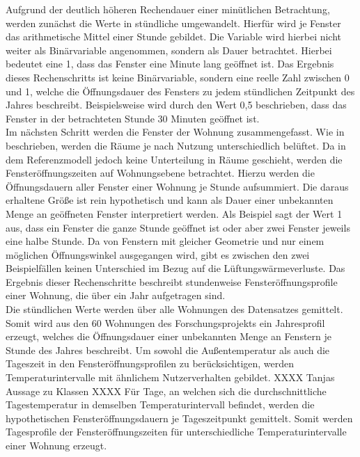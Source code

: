 Aufgrund der deutlich höheren Rechendauer einer minütlichen Betrachtung, werden zunächst die Werte in stündliche umgewandelt. 
Hierfür wird je Fenster das arithmetische Mittel einer Stunde gebildet.
Die Variable wird hierbei nicht weiter als Binärvariable angenommen, sondern als Dauer betrachtet.
Hierbei bedeutet eine 1, dass das Fenster eine Minute lang geöffnet ist.
Das Ergebnis dieses Rechenschritts ist keine Binärvariable, sondern eine reelle Zahl zwischen 0 und 1, welche die Öffnungsdauer des Fensters zu jedem stündlichen Zeitpunkt des Jahres beschreibt.
Beispielsweise wird durch den Wert 0,5 beschrieben, dass das Fenster in der betrachteten Stunde 30 Minuten geöffnet ist.\\
Im nächsten Schritt werden die Fenster der Wohnung zusammengefasst.
Wie in \cite{Osterhage.2018} beschrieben, werden die Räume je nach Nutzung unterschiedlich belüftet.
Da in dem Referenzmodell jedoch keine Unterteilung in Räume geschieht, werden die Fensteröffnungszeiten auf Wohnungsebene betrachtet.
Hierzu werden die Öffnungsdauern aller Fenster einer Wohnung je Stunde aufsummiert.
Die daraus erhaltene Größe ist rein hypothetisch und kann als Dauer einer unbekannten Menge an geöffneten Fenster interpretiert werden.
Als Beispiel sagt der Wert 1 aus, dass ein Fenster die ganze Stunde geöffnet ist oder aber zwei Fenster jeweils eine halbe Stunde.
Da von Fenstern mit gleicher Geometrie und nur einem möglichen Öffnungswinkel ausgegangen wird, gibt es zwischen den zwei Beispielfällen keinen Unterschied im Bezug auf die Lüftungswärmeverluste.
Das Ergebnis dieser Rechenschritte beschreibt stundenweise Fensteröffnungsprofile einer Wohnung, die über ein Jahr aufgetragen sind.\\
Die stündlichen Werte werden über alle Wohnungen des Datensatzes gemittelt.
Somit wird aus den 60 Wohnungen des Forschungsprojekts ein Jahresprofil erzeugt, welches die Öffnungsdauer einer unbekannten Menge an Fenstern je Stunde des Jahres beschreibt.
Um sowohl die Außentemperatur als auch die Tageszeit in den Fensteröffnungsprofilen zu berücksichtigen, werden Temperaturintervalle mit ähnlichem Nutzerverhalten gebildet. XXXX Tanjas Aussage zu Klassen XXXX
Für Tage, an welchen sich die durchschnittliche Tagestemperatur in demselben Temperaturintervall befindet, werden die hypothetischen Fensteröffnungsdauern je Tageszeitpunkt gemittelt.
Somit werden Tagesprofile der Fensteröffnungszeiten für unterschiedliche Temperaturintervalle einer Wohnung erzeugt.

